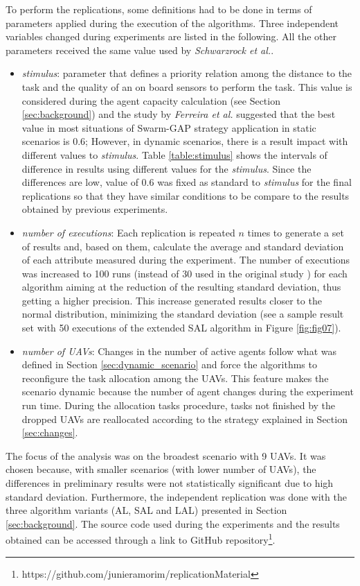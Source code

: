 To perform the replications, some definitions had to be done in terms of parameters applied during the execution of the algorithms. Three independent variables changed during experiments are listed in the following. All the other parameters received the same value used by \textit{Schwarzrock et al.}\cite{MAS07}.
\begin{itemize}
   \item \textit{stimulus}: parameter that defines a priority relation among the distance to the task and the quality of an on board sensors to perform the task. This value is considered during the agent capacity calculation (see Section \ref{sec:background}) and the study by \textit{Ferreira et al.} \cite{ferreira2010robocup} suggested that the best value in most situations of Swarm-GAP strategy application in static scenarios is $0.6$; However, in dynamic scenarios, there is a result impact with different values to \textit{stimulus}. Table \ref{table:stimulus} shows the intervals of difference in results using different values for the \textit{stimulus}. Since the differences are low, value of $0.6$ was fixed as standard to \textit{stimulus} for the final replications so that they have similar conditions to be compare to the results obtained by previous experiments.
   \item \textit{number of executions}: Each replication is repeated $n$ times to generate a set of results and, based on them, calculate the average and standard deviation of each attribute measured during the experiment. The number of executions was increased to 100 runs (instead of 30 used in the original study \cite{MAS07}) for each algorithm aiming at the reduction of the resulting standard deviation, thus getting a higher precision. This increase generated results closer to the normal distribution, minimizing the standard deviation (see a sample result set with 50 executions of the extended SAL algorithm in Figure \ref{fig:fig07}).
   \item \textit{number of UAVs}: Changes in the number of active agents follow what was defined in Section \ref{sec:dynamic_scenario} and force the algorithms to reconfigure the task allocation among the UAVs. This feature makes the scenario dynamic because the number of agent changes during the experiment run time. During the allocation tasks procedure, tasks not finished by the dropped UAVs are reallocated according to the strategy explained in Section \ref{sec:changes}.
\end{itemize}

The focus of the analysis was on the broadest scenario with 9 UAVs. It was chosen because, with smaller scenarios (with lower number of UAVs), the differences in preliminary results were not statistically significant due to high standard deviation. Furthermore, the independent replication was done with the three algorithm variants (AL, SAL and LAL) presented in Section \ref{sec:background}. The source code used during the experiments and the results obtained can be accessed through a link to GitHub repository\footnote{https://github.com/junieramorim/replicationMaterial}.


